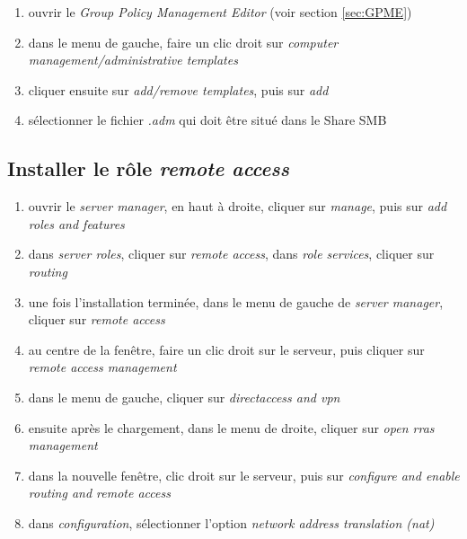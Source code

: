 \documentclass[a4paper]{article}
\begin{document}
\begin{enumerate}
    \item ouvrir le \textit{Group Policy Management Editor} (voir section \ref{sec:GPME})
    \item dans le menu de gauche, faire un clic droit sur \textit{computer management/administrative templates}
    \item cliquer ensuite sur \textit{add/remove templates}, puis sur \textit{add}
    \item sélectionner le fichier \textit{.adm} qui doit être situé dans le Share SMB
\end{enumerate}





\subsection{Installer le rôle \textit{remote access}}



\begin{enumerate}
    \item ouvrir le \textit{server manager}, en haut à droite, cliquer sur \textit{manage}, puis sur \textit{add roles and features}
    \item dans \textit{server roles}, cliquer sur \textit{remote access}, dans \textit{role services}, cliquer sur \textit{routing}
    \item une fois l'installation terminée, dans le menu de gauche de \textit{server manager}, cliquer sur \textit{remote access}
    \item au centre de la fenêtre, faire un clic droit sur le serveur, puis cliquer sur \textit{remote access management}
    \item dans le menu de gauche, cliquer sur \textit{directaccess and vpn}
    \item ensuite après le chargement, dans le menu de droite, cliquer sur \textit{open rras management}
    \item dans la nouvelle fenêtre, clic droit sur le serveur, puis sur \textit{configure and enable routing and remote access}
    \item dans \textit{configuration}, sélectionner l'option \textit{network address translation (nat)}
\end{enumerate}
\end{document}
